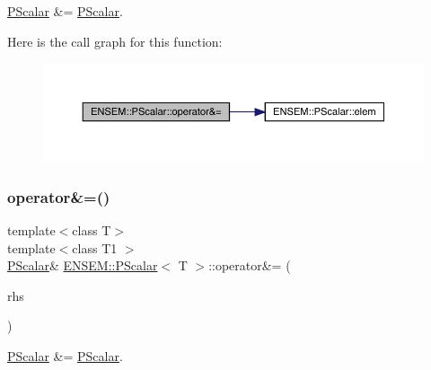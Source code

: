 \mbox{\hyperlink{classENSEM_1_1PScalar}{P\+Scalar}} \&= \mbox{\hyperlink{classENSEM_1_1PScalar}{P\+Scalar}}. 

Here is the call graph for this function\+:
\nopagebreak
\begin{figure}[H]
\begin{center}
\leavevmode
\includegraphics[width=350pt]{d3/d27/classENSEM_1_1PScalar_a9c683c36c7129b6b016af09f8d5cda42_cgraph}
\end{center}
\end{figure}
\mbox{\label{classENSEM_1_1PScalar_a9c683c36c7129b6b016af09f8d5cda42}} 
\subsubsection{\texorpdfstring{operator\&=()}{operator\&=()}\hspace{0.1cm}{\footnotesize\ttfamily [2/3]}}
{\footnotesize\ttfamily template$<$class T$>$ \\
template$<$class T1 $>$ \\
\mbox{\hyperlink{classENSEM_1_1PScalar}{P\+Scalar}}\& \mbox{\hyperlink{classENSEM_1_1PScalar}{E\+N\+S\+E\+M\+::\+P\+Scalar}}$<$ T $>$\+::operator\&= (\begin{DoxyParamCaption}\item[{const \mbox{\hyperlink{classENSEM_1_1PScalar}{P\+Scalar}}$<$ T1 $>$ \&}]{rhs }\end{DoxyParamCaption})\hspace{0.3cm}{\ttfamily [inline]}}



\mbox{\hyperlink{classENSEM_1_1PScalar}{P\+Scalar}} \&= \mbox{\hyperlink{classENSEM_1_1PScalar}{P\+Scalar}}. 

